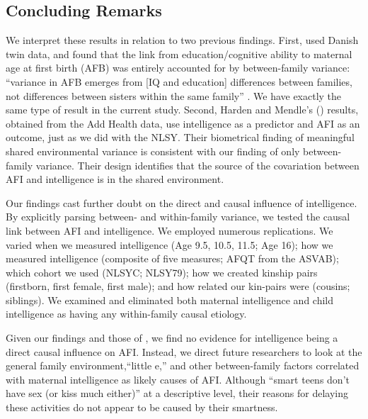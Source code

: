 \subsection{Concluding Remarks} We interpret these results in relation to two previous findings. First, \citet{Rodgers2008AJS} used Danish twin data, and found that the link from education/cognitive ability to maternal age at first birth (AFB) was entirely accounted for by between-family variance: ``variance in AFB emerges from [IQ and education] differences between families, not differences between sisters within the same family'' \citep[][p. 202]{Rodgers2008AJS}. We have exactly the same type of result in the current study. Second, Harden and Mendle's (\citeyear{harden2011don}) results, obtained from the Add Health data, use intelligence as a predictor and AFI as an outcome, just as we did with the NLSY. Their biometrical finding of meaningful shared environmental variance is consistent with our finding of only between-family variance. Their design identifies that the source of the covariation between AFI and intelligence is in the shared environment.

Our findings cast further doubt on the direct and causal influence of intelligence. By explicitly parsing between- and within-family variance, we tested the causal link between AFI and intelligence. We employed numerous replications. We varied when we measured intelligence (Age 9.5, 10.5, 11.5; Age 16); how we measured intelligence (composite of five measures; AFQT from the ASVAB); which cohort we used (NLSYC; NLSY79); how we created kinship pairs (firstborn, first female, first male); and how related our kin-pairs were (cousins; siblings). We examined and eliminated both maternal intelligence and child intelligence as having any within-family causal etiology.

Given our findings and those of \citet{harden2011don}, we find no evidence for intelligence being a direct causal influence on AFI. Instead, we direct future researchers to look at the general family environment,``little e,'' and other between-family factors correlated with maternal intelligence as likely causes of AFI.  Although ``smart teens don't have sex (or kiss much either)'' \citep{halpern2000smart} at a descriptive level, their reasons for delaying these activities do not appear to be caused by their smartness.